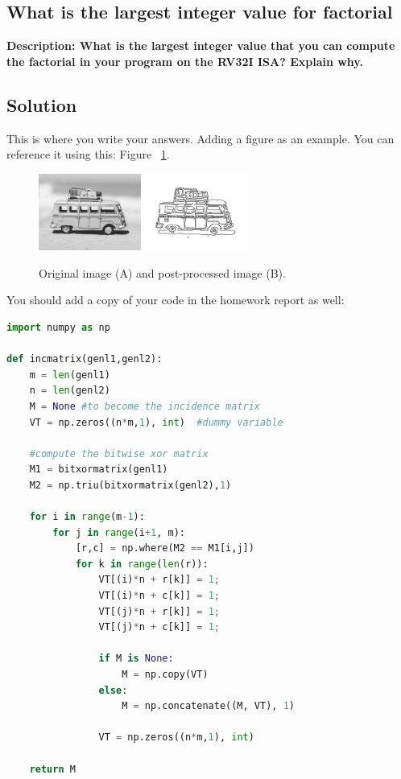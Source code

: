 \subsection{What is the largest integer value for factorial}
\textbf{Description: What is the largest integer value that you can compute the factorial in your program on the RV32I ISA? Explain why.}

\breakrule

\subsection{Solution}

This is where you write your answers. Adding a figure as an example. You can reference it using this: Figure ~\ref{fig:example}.

\begin{figure}[!htbp]
\centering 
        \includegraphics[width=0.3\textwidth]{figs/beachbus.jpg}
        \includegraphics[width=0.3\textwidth]{figs/beachbus-canny.jpg}
\caption[Original image and post processed image]{Original image (A) and post-processed image (B).}
\label{fig:example} 
\end{figure}

You should add a copy of your code in the homework report as well:

\begin{lstlisting}[language=Python, caption=Python example]
import numpy as np
 
def incmatrix(genl1,genl2):
    m = len(genl1)
    n = len(genl2)
    M = None #to become the incidence matrix
    VT = np.zeros((n*m,1), int)  #dummy variable
 
    #compute the bitwise xor matrix
    M1 = bitxormatrix(genl1)
    M2 = np.triu(bitxormatrix(genl2),1) 
 
    for i in range(m-1):
        for j in range(i+1, m):
            [r,c] = np.where(M2 == M1[i,j])
            for k in range(len(r)):
                VT[(i)*n + r[k]] = 1;
                VT[(i)*n + c[k]] = 1;
                VT[(j)*n + r[k]] = 1;
                VT[(j)*n + c[k]] = 1;
 
                if M is None:
                    M = np.copy(VT)
                else:
                    M = np.concatenate((M, VT), 1)
 
                VT = np.zeros((n*m,1), int)
 
    return M
\end{lstlisting}

